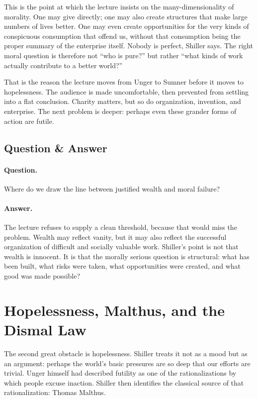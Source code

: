 This is the point at which the lecture insists on the many-dimensionality of morality. One may give directly; one may also create structures that make large numbers of lives better. One may even create opportunities for the very kinds of conspicuous consumption that offend us, without that consumption being the proper summary of the enterprise itself. Nobody is perfect, Shiller says. The right moral question is therefore not ``who is pure?'' but rather ``what kinds of work actually contribute to a better world?''

That is the reason the lecture moves from Unger to Sumner before it moves to hopelessness. The audience is made uncomfortable, then prevented from settling into a flat conclusion. Charity matters, but so do organization, invention, and enterprise. The next problem is deeper: perhaps even these grander forms of action are futile.

\subsection{Question \& Answer}

\paragraph{Question.} Where do we draw the line between justified wealth and moral failure?

\paragraph{Answer.} The lecture refuses to supply a clean threshold, because that would miss the problem. Wealth may reflect vanity, but it may also reflect the successful organization of difficult and socially valuable work. Shiller's point is not that wealth is innocent. It is that the morally serious question is structural: what has been built, what risks were taken, what opportunities were created, and what good was made possible?

\section{Hopelessness, Malthus, and the Dismal Law}

The second great obstacle is hopelessness. Shiller treats it not as a mood but as an argument: perhaps the world's basic pressures are so deep that our efforts are trivial. Unger himself had described futility as one of the rationalizations by which people excuse inaction. Shiller then identifies the classical source of that rationalization: Thomas Malthus.

